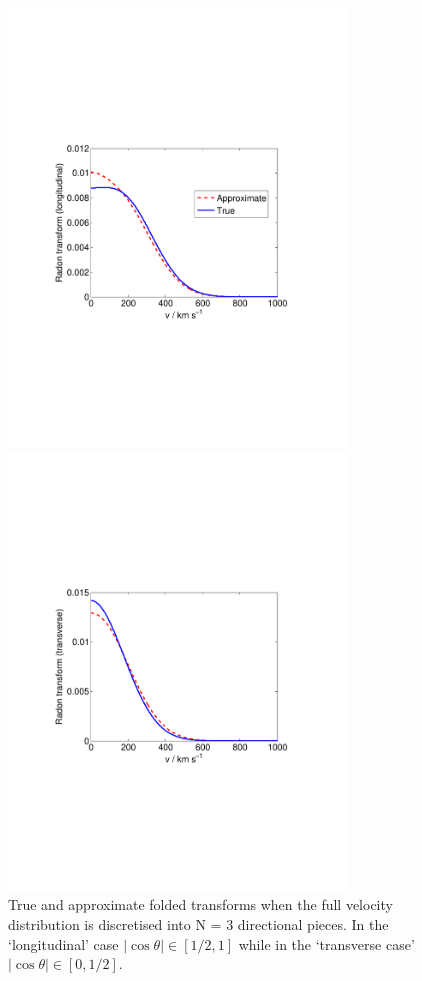 \begin{figure}[t]
\label{fig:directional:radonN3folded}
  \centering
  \includegraphics[trim={2cm 8cm 2cm 8cm},clip,width=0.80\textwidth]{Directional/N3-longitudinal.pdf}

  \includegraphics[trim={2cm 8cm 2cm 8cm},clip,width=0.80\textwidth]{Directional/N3-transverse.pdf}

\caption{True and approximate folded transforms when the full velocity distribution is discretised into N = 3 directional pieces. In the `longitudinal' case $|\cos\theta| \in [1/2,1]$ while in the `transverse case' $|\cos\theta| \in [0, 1/2]$.}
\end{figure}

